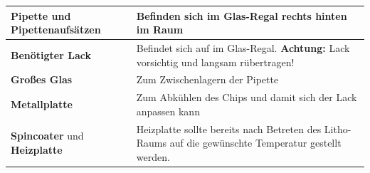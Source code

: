 \documentclass[
  ngerman,
  twoside,
  captions=tableheading,
  BCOR=.5cm,
  fontsize=11,
  ]{scrreprt}
\begin{document}
\begin{tabular}{| p{5cm} | p{10cm} |} \hline
\textbf{Pipette und Pipettenaufsätzen} & Befinden sich im Glas-Regal rechts hinten im Raum\\ \hline
\textbf{Benötigter Lack} & Befindet sich auf im Glas-Regal.\newline
\textbf{Achtung:} Lack vorsichtig und langsam rübertragen!\\ \hline
\textbf{Großes Glas} & Zum Zwischenlagern der Pipette\\ \hline
\textbf{Metallplatte} & Zum Abkühlen des Chips und damit sich der Lack anpassen kann\\ \hline
\textbf{Spincoater} und \textbf{Heizplatte} & Heizplatte sollte bereits nach Betreten des Litho-Raums auf die gewünschte Temperatur gestellt werden.\\ \hline

\end{tabular}

\bigskip
\end{document}
